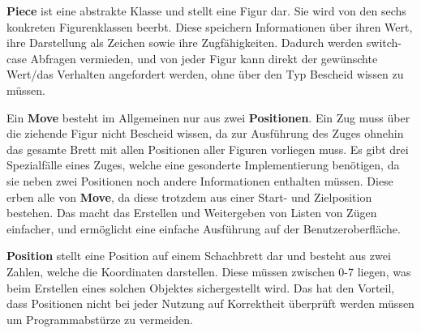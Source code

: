 \documentclass[parskip=full]{scrartcl}
\begin{document}
\begin{description}
					\item \textbf{Piece} ist eine abstrakte Klasse und stellt eine Figur dar. Sie wird von den sechs konkreten Figurenklassen beerbt. Diese speichern Informationen über ihren Wert, ihre Darstellung als Zeichen sowie ihre Zugfähigkeiten. Dadurch werden switch-case Abfragen vermieden, und von jeder Figur kann direkt der gewünschte Wert/das Verhalten angefordert werden, ohne über den Typ Bescheid wissen zu müssen.
					\item Ein \textbf{Move} besteht im Allgemeinen nur aus zwei \textbf{Positionen}. Ein Zug muss über die ziehende Figur nicht Bescheid wissen, da zur Ausführung des Zuges ohnehin das gesamte Brett mit allen Positionen aller Figuren vorliegen muss. Es gibt drei Spezialfälle eines Zuges, welche eine gesonderte Implementierung benötigen, da sie neben zwei Positionen noch andere Informationen enthalten müssen. Diese erben alle von \textbf{Move}, da diese trotzdem aus einer Start- und Zielposition bestehen. Das macht das Erstellen und Weitergeben von Listen von Zügen einfacher, und ermöglicht eine einfache Ausführung auf der Benutzeroberfläche.
					\item \textbf{Position} stellt eine Position auf einem Schachbrett dar und besteht aus zwei Zahlen, welche die Koordinaten darstellen. Diese müssen zwischen 0-7 liegen, was beim Erstellen eines solchen Objektes sichergestellt wird. Das hat den Vorteil, dass Positionen nicht bei jeder Nutzung auf Korrektheit überprüft werden müssen um Programmabstürze zu vermeiden.
				\end{description}		
		\newpage
		
\end{document}
